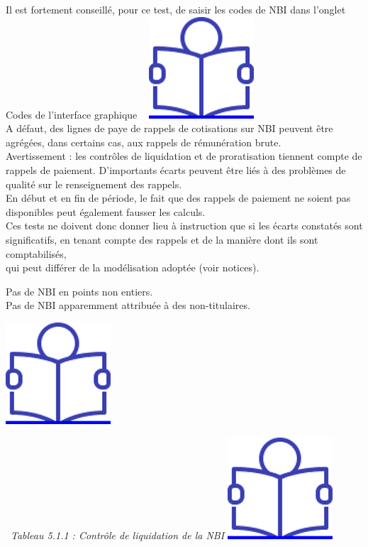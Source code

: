 Il est fortement conseillé, pour ce test, de saisir les codes de NBI
dans l'onglet Codes de l'interface graphique ~
\href{../Docs/Notices/fiche_onglet_codes.odt}{\includegraphics{icones/Notice.png}}\\
A défaut, des lignes de paye de rappels de cotisations sur NBI peuvent
être agrégées, dans certains cas, aux rappels de rémunération brute.\\
Avertissement : les contrôles de liquidation et de proratisation
tiennent compte de rappels de paiement. D'importants écarts peuvent être
liés à des problèmes de qualité sur le renseignement des rappels.\\
En début et en fin de période, le fait que des rappels de paiement ne
soient pas disponibles peut également fausser les calculs.\\
Ces tests ne doivent donc donner lieu à instruction que si les écarts
constatés sont significatifs, en tenant compte des rappels et de la
manière dont ils sont comptabilisés,\\
qui peut différer de la modélisation adoptée (voir notices).

Pas de NBI en points non entiers.\\
Pas de NBI apparemment attribuée à des non-titulaires.

\href{../Docs/Notices/fiche_NBI_nt.odt}{\includegraphics{icones/Notice.png}}

~\emph{Tableau 5.1.1 : Contrôle de liquidation de la NBI}
\href{../Docs/Notices/fiche_NBI_liq.odt}{\includegraphics{icones/Notice.png}}


